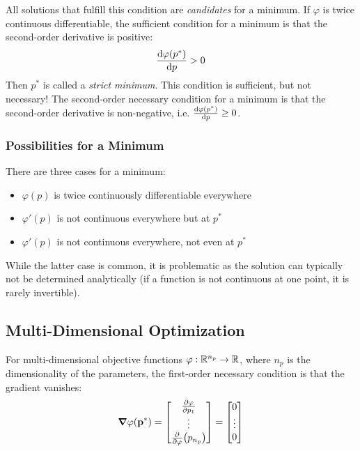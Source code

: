 			All solutions that fulfill this condition are \emph{candidates} for a minimum. If \( \varphi \) is twice continuous differentiable, the sufficient condition for a minimum is that the second-order derivative is positive:
			\begin{align*}
				\dv{\varphi(p^\ast)}{p} > 0
			\end{align*}
			Then \(p^\ast\) is called a \emph{strict minimum}. This condition is sufficient, but not necessary! The second-order necessary condition for a minimum is that the second-order derivative is non-negative, i.e. \( \dv{\varphi(p^\ast)}{p} \geq 0 \).
			
			\subsubsection{Possibilities for a Minimum}
				There are three cases for a minimum:
				\begin{itemize}
					\item \(\varphi(p)\) is twice continuously differentiable everywhere
					\item \(\varphi'(p)\) is not continuous everywhere but at \(p^\ast\)
					\item \(\varphi'(p)\) is not continuous everywhere, not even at \(p^\ast\)
				\end{itemize}
				While the latter case is common, it is problematic as the solution can typically not be determined analytically (if a function is not continuous at one point, it is rarely invertible).

		\subsection{Multi-Dimensional Optimization}
			For multi-dimensional objective functions \( \varphi : \mathbb{R}^{n_p} \to \mathbb{R} \), where \(n_p\) is the dimensionality of the parameters, the first-order necessary condition is that the gradient vanishes:
			\begin{align*}
				\grad{\varphi}(\boldsymbol{\mathrm{p}}^\ast) =
					\begin{bmatrix}
						\pdv{\varphi}{p_1} \\
						\vdots \\
						\pdv{\varphi}(p_{n_p})
					\end{bmatrix}
				=
					\begin{bmatrix}
						0 \\
						\vdots \\
						0
					\end{bmatrix}
			\end{align*}
			
